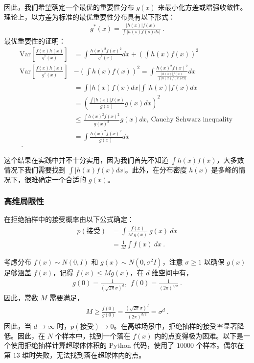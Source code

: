 因此，我们希望确定一个最优的重要性分布 \(g(x)\) 来最小化方差或增强收敛性。理论上，以方差为标准的最优重要性分布具有以下形式：
\begin{align}
    g^{*}(x)=\frac{|h(x)|f(x)}{\int|h(s)f(s)d s|}~.
\end{align}
最优重要性的证明：
\begin{align}
\text{Var}\left[\frac{f(x)h(x)}{g^{*}(x)}\right]&=\int\frac{h(x)^{2}f(x)^{2}}{g^{*}(x)}d x+\left(\int h(x) f(x)\right)^{2} \\ 
\text{Var}\left[\frac{f(x)h(x)}{g^{*}(x)}\right]&-\left(\int h(x) f(x)\right)^{2}=\int\frac{h(x)^{2}f(x)^{2}}{\frac{|h(x)|f(x)}{\int|h(x)f(x)dx|}}d x \\
    &=\int|h(x)f(x)d x|\int|h(x)|f(x)d x\\
    &=\left(\frac{\int|h(x)|f(x)}{g(x)}  g(x) d x\right)^2\\
    &\leq \frac{\int h(x)^2f(x)^2}{g(x)^2}  g(x) d x \text{, Cauchy Schwarz inequality }\\
    &=\int\frac{h(x)^{2}f(x)^{2}}{g(x)}d x\\~.
\end{align}

这个结果在实践中并不十分实用，因为我们首先不知道 $\int h(x) f(x)$，大多数情况下我们需要找到 $\int|h(x)f(x)dx|$。此外，在分布密度 $h(x)$ 是多峰的情况下，很难确定一个合适的 $g(x)$。

\subsubsection{高维局限性}
在拒绝抽样中的接受概率由以下公式确定：
\begin{align}   
    p(\text{接受}) &=  \int\frac{f(x)}{M \ g(x)} \ g(x) \ d x \\
    &=\frac{1}{M}\int f(x) \ d x~.
\end{align}

考虑分布 $f(x) \sim N(0, I)$ 和 $g(x)\sim N(0, \sigma^2 I)$，注意 $\sigma \geq 1$ 以确保 $g(x)$ 足够涵盖 $f(x)$，记得 $f(x) \leq Mg(x)$，在 $d$ 维空间中有，
\begin{align}
    g(0) = \frac{1}{(\sqrt{2\pi}\sigma)^d}, \ \ f(0) = \frac{1}{(2\pi)^{d/2}}~.
\end{align}
因此，常数 $M$ 需要满足，
\begin{align}
   M \geq \frac{f(0)}{g(0)} = \frac{(\sqrt{2\pi}\sigma)^d}{(2\pi)^{d/2}} = \sigma^d~.
\end{align}
因此，当 $d \to \infty$ 时，$p(\text{接受})\to 0$。在高维场景中，拒绝抽样的接受率显著降低。因此，在 $N$ 个样本中，找到一个落在 $f(x)$ 内的点变得极为困难。以下是一个使用拒绝抽样计算超球体体积的 Python 代码，使用了 $10000$ 个样本。偶尔在第 $13$ 维时失败，无法找到落在超球体内的点。

